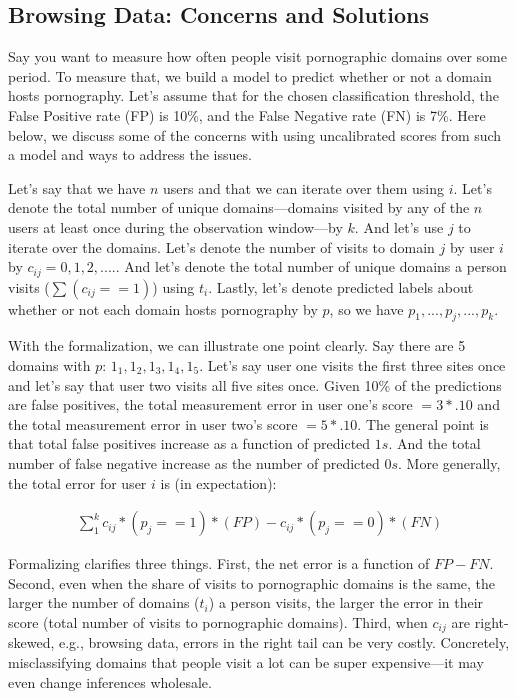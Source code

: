 \documentclass[12pt, letterpaper]{article}
\begin{document}
\subsection{Browsing Data: Concerns and Solutions}
Say you want to measure how often people visit pornographic domains over some period. To measure that, we build a model to predict whether or not a domain hosts pornography. Let's assume that for the chosen classification threshold, the False Positive rate (FP) is 10\%, and the False Negative rate (FN) is 7\%. Here below, we discuss some of the concerns with using uncalibrated scores from such a model and ways to address the issues.

Let's say that we have $n$ users and that we can iterate over them using $i$. Let's denote the total number of unique domains---domains visited by any of the $n$ users at least once during the observation window---by $k$. And let's use $j$ to iterate over the domains. Let's denote the number of visits to domain $j$ by user $i$ by $c_{ij} = {0, 1, 2, ....}$. And let's denote the total number of unique domains a person visits ($\sum (c_{ij} == 1)$) using $t_i$. Lastly, let's denote predicted labels about whether or not each domain hosts pornography by $p$, so we have $p_1, ..., p_j, ... , p_k$.

With the formalization, we can illustrate one point clearly. Say there are 5 domains with $p$: ${1_1, 1_2, 1_3, 1_4, 1_5}$. Let's say user one visits the first three sites once and let's say that user two visits all five sites once. Given 10\% of the predictions are false positives, the total measurement error in user one's score $= 3 * .10$ and the total measurement error in user two's score $= 5 * .10$. The general point is that total false positives increase as a function of predicted $1s$. And the total number of false negative increase as the number of predicted $0s$. More generally, the total error for user $i$ is (in expectation):

\begin{align}
\label{eq:net_error}
    \sum_1^k c_{ij} * (p_j == 1) * (FP) - c_{ij} * (p_j == 0) * (FN)
\end{align}

Formalizing clarifies three things. First, the net error is a function of $FP - FN$. Second, even when the share of visits to pornographic domains is the same, the larger the number of domains ($t_i$) a person visits, the larger the error in their score (total number of visits to pornographic domains). Third, when $c_{ij}$ are right-skewed, e.g., browsing data, errors in the right tail can be very costly. Concretely, misclassifying domains that people visit a lot can be super expensive---it may even change inferences wholesale.
\end{document}
